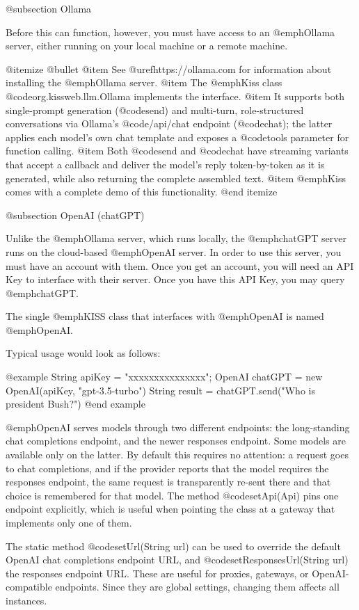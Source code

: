 @subsection Ollama

Before this can function, however, you must have access to an @emph{Ollama} server, either running on your local machine or a remote machine.

@itemize @bullet
@item
See @uref{https://ollama.com} for information about installing the @emph{Ollama} server.
@item
The @emph{Kiss} class @code{org.kissweb.llm.Ollama} implements the interface.
@item
It supports both single-prompt generation (@code{send}) and multi-turn,
role-structured conversations via Ollama's @code{/api/chat} endpoint
(@code{chat}); the latter applies each model's own chat template and exposes
a @code{tools} parameter for function calling.
@item
Both @code{send} and @code{chat} have streaming variants that accept a
callback and deliver the model's reply token-by-token as it is generated,
while also returning the complete assembled text.
@item
@emph{Kiss} comes with a complete demo of this functionality.
@end itemize

@subsection OpenAI (chatGPT)

Unlike the @emph{Ollama} server, which runs locally, the @emph{chatGPT}
server runs on the cloud-based @emph{OpenAI} server.  In order to use
this server, you must have an account with them.  Once you get an
account, you will need an API Key to interface with their server.
Once you have this API Key, you may query @emph{chatGPT}.

The single @emph{KISS} class that interfaces with @emph{OpenAI} is
named @emph{OpenAI}.  

Typical usage would look as follows:

@example
    String apiKey = "xxxxxxxxxxxxxxx";
    OpenAI chatGPT = new OpenAI(apiKey, "gpt-3.5-turbo")
    String result = chatGPT.send("Who is president Bush?")
@end example

@emph{OpenAI} serves models through two different endpoints: the
long-standing chat completions endpoint, and the newer responses
endpoint.  Some models are available only on the latter.  By default
this requires no attention: a request goes to chat completions, and if
the provider reports that the model requires the responses endpoint, the
same request is transparently re-sent there and that choice is
remembered for that model.  The method @code{setApi(Api)} pins one
endpoint explicitly, which is useful when pointing the class at a
gateway that implements only one of them.

The static method @code{setUrl(String url)} can be used to override the
default OpenAI chat completions endpoint URL, and
@code{setResponsesUrl(String url)} the responses endpoint URL.  These
are useful for proxies, gateways, or OpenAI-compatible endpoints.  Since
they are global settings, changing them affects all instances.

